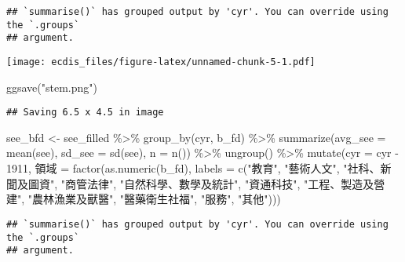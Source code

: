 \documentclass[
]{article}
\newenvironment{Shaded}{\begin{snugshade}}{\end{snugshade}}
\newcommand{\AttributeTok}[1]{\textcolor[rgb]{0.77,0.63,0.00}{#1}}
\newcommand{\DecValTok}[1]{\textcolor[rgb]{0.00,0.00,0.81}{#1}}
\newcommand{\FunctionTok}[1]{\textcolor[rgb]{0.00,0.00,0.00}{#1}}
\newcommand{\NormalTok}[1]{#1}
\newcommand{\OtherTok}[1]{\textcolor[rgb]{0.56,0.35,0.01}{#1}}
\newcommand{\SpecialCharTok}[1]{\textcolor[rgb]{0.00,0.00,0.00}{#1}}
\newcommand{\StringTok}[1]{\textcolor[rgb]{0.31,0.60,0.02}{#1}}
\begin{document}
\begin{verbatim}
## `summarise()` has grouped output by 'cyr'. You can override using the `.groups`
## argument.
\end{verbatim}

\texttt{[image: ecdis\_files/figure-latex/unnamed-chunk-5-1.pdf]}

\begin{Shaded}
\begin{Highlighting}[]
\FunctionTok{ggsave}\NormalTok{(}\StringTok{"stem.png"}\NormalTok{)}
\end{Highlighting}
\end{Shaded}

\begin{verbatim}
## Saving 6.5 x 4.5 in image
\end{verbatim}

\begin{Shaded}
\begin{Highlighting}[]
\NormalTok{see\_bfd }\OtherTok{\textless{}{-}}\NormalTok{ see\_filled }\SpecialCharTok{\%\textgreater{}\%}
  \FunctionTok{group\_by}\NormalTok{(cyr, b\_fd) }\SpecialCharTok{\%\textgreater{}\%}
  \FunctionTok{summarize}\NormalTok{(}\AttributeTok{avg\_see =} \FunctionTok{mean}\NormalTok{(see),}
            \AttributeTok{sd\_see =} \FunctionTok{sd}\NormalTok{(see),}
            \AttributeTok{n =} \FunctionTok{n}\NormalTok{()) }\SpecialCharTok{\%\textgreater{}\%}
  \FunctionTok{ungroup}\NormalTok{() }\SpecialCharTok{\%\textgreater{}\%}
  \FunctionTok{mutate}\NormalTok{(}\AttributeTok{cyr =}\NormalTok{ cyr }\SpecialCharTok{{-}} \DecValTok{1911}\NormalTok{,}
\NormalTok{         領域 }\OtherTok{=} \FunctionTok{factor}\NormalTok{(}\FunctionTok{as.numeric}\NormalTok{(b\_fd), }\AttributeTok{labels =} \FunctionTok{c}\NormalTok{(}\StringTok{"教育"}\NormalTok{, }\StringTok{"藝術人文"}\NormalTok{, }\StringTok{"社科、新聞及圖資"}\NormalTok{, }\StringTok{"商管法律"}\NormalTok{, }\StringTok{"自然科學、數學及統計"}\NormalTok{, }\StringTok{"資通科技"}\NormalTok{, }\StringTok{"工程、製造及營建"}\NormalTok{, }\StringTok{"農林漁業及獸醫"}\NormalTok{, }\StringTok{"醫藥衛生社福"}\NormalTok{, }\StringTok{"服務"}\NormalTok{, }\StringTok{"其他"}\NormalTok{)))}
\end{Highlighting}
\end{Shaded}

\begin{verbatim}
## `summarise()` has grouped output by 'cyr'. You can override using the `.groups`
## argument.
\end{verbatim}
\end{document}
